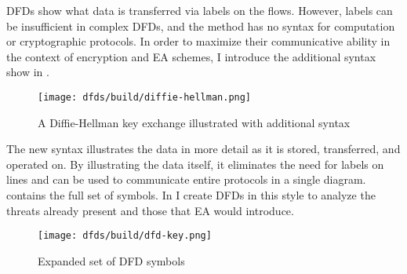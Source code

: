 \Acp{DFD} show what data is transferred via labels on the flows. However, labels can be insufficient in complex
\acp{DFD}, and the method has no syntax for computation or cryptographic protocols. In order to maximize their
communicative ability in the context of encryption and \acl{EA} schemes, I introduce the additional syntax show in
.

\begin{figure}[h]
    \centering\CaptionFontSize
    \texttt{[image: dfds/build/diffie-hellman.png]}
    \caption{A Diffie-Hellman key exchange illustrated with additional syntax}
    \label{fig-dfd-dh-updated}
\end{figure}

The new syntax illustrates the data in more detail as it is stored, transferred, and operated on. By illustrating the
data itself, it eliminates the need for labels on lines and can be used to communicate entire protocols in a single
diagram.  contains the full set of symbols. In  I create \acp{DFD} in this
style to analyze the threats already present and those that \ac{EA} would introduce.

\begin{figure}[h]
    \centering\CaptionFontSize
    \texttt{[image: dfds/build/dfd-key.png]}
    \caption{Expanded set of DFD symbols}
    \label{fig-dfd-key}
\end{figure}
